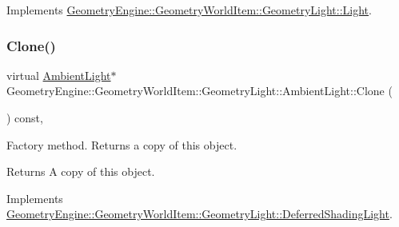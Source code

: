 Implements \mbox{\hyperlink{class_geometry_engine_1_1_geometry_world_item_1_1_geometry_light_1_1_light_a58aa2a3520f7aa2b03afcb4123e7530a}{Geometry\+Engine\+::\+Geometry\+World\+Item\+::\+Geometry\+Light\+::\+Light}}.

\mbox{\label{class_geometry_engine_1_1_geometry_world_item_1_1_geometry_light_1_1_ambient_light_a890a2ff8ce5cde88cdc51b4e598ca9af}} 
\subsubsection{\texorpdfstring{Clone()}{Clone()}}
{\footnotesize\ttfamily virtual \mbox{\hyperlink{class_geometry_engine_1_1_geometry_world_item_1_1_geometry_light_1_1_ambient_light}{Ambient\+Light}}$\ast$ Geometry\+Engine\+::\+Geometry\+World\+Item\+::\+Geometry\+Light\+::\+Ambient\+Light\+::\+Clone (\begin{DoxyParamCaption}{ }\end{DoxyParamCaption}) const\hspace{0.3cm}{\ttfamily [inline]}, {\ttfamily [virtual]}}

Factory method. Returns a copy of this object. \begin{DoxyReturn}{Returns}
A copy of this object. 
\end{DoxyReturn}


Implements \mbox{\hyperlink{class_geometry_engine_1_1_geometry_world_item_1_1_geometry_light_1_1_deferred_shading_light_a7ef4d7b7a41cbda01a55bcb0475484d3}{Geometry\+Engine\+::\+Geometry\+World\+Item\+::\+Geometry\+Light\+::\+Deferred\+Shading\+Light}}.

\mbox{\label{class_geometry_engine_1_1_geometry_world_item_1_1_geometry_light_1_1_ambient_light_a1c70ea9fb43e4242ef93ffd154304988}} 
